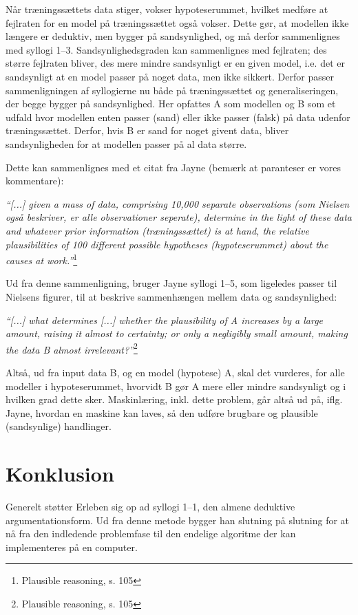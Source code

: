 \documentclass[10pt,a4paper]{article}
\newcommand{\citat}[2]{\begin{justify}\textit{``#1''}\hspace{0.1cm}\footnote{#2}\end{justify}}
\begin{document}
Når træningssættets data stiger, vokser hypoteserummet, hvilket medføre at fejlraten for en model på træningssættet også vokser. Dette gør, at modellen ikke længere er deduktiv, men bygger på sandsynlighed, og må derfor sammenlignes med syllogi 1--3. Sandsynlighedsgraden kan sammenlignes med fejlraten; des større fejlraten bliver, des mere mindre sandsynligt er en given model, i.e. det er sandsynligt at en model passer på noget data, men ikke sikkert. Derfor passer sammenligningen af syllogierne nu både på træningssættet og generaliseringen, der begge bygger på sandsynlighed. Her opfattes A som modellen og B som et udfald hvor modellen enten passer (sand) eller ikke passer (falsk) på data udenfor træningssættet. Derfor, hvis B er sand for noget givent data, bliver sandsynligheden for at modellen passer på al data større.

Dette kan sammenlignes med et citat fra Jayne (bemærk at paranteser er vores kommentare):
\citat{[...] given a mass of data, comprising 10,000 separate observations (som Nielsen også beskriver, er alle observationer seperate), determine in the light of these data and whatever prior information (træningssættet) is at hand, the relative plausibilities of 100 different possible hypotheses (hypoteserummet) about the causes at work.}{Plausible reasoning, s. 105}

Ud fra denne sammenligning, bruger Jayne syllogi 1--5, som ligeledes passer til Nielsens figurer, til at beskrive sammenhængen mellem data og sandsynlighed:

\citat{[...] what determines [...] whether the plausibility of A increases by a large amount, raising it almost to certainty; or only a negligibly small amount, making the data B almost irrelevant?}{Plausible reasoning, s. 105}

Altså, ud fra input data B, og en model (hypotese) A, skal det vurderes, for alle modeller i hypoteserummet, hvorvidt B gør A mere eller mindre sandsynligt og i hvilken grad dette sker. Maskinlæring, inkl. dette problem, går altså ud på, iflg. Jayne, hvordan en maskine kan laves, så den udføre brugbare og plausible (sandsynlige) handlinger. 



\section{Konklusion}
Generelt støtter Erleben sig op ad syllogi 1--1, den almene deduktive argumentationsform. Ud fra denne metode bygger han slutning på slutning for at nå fra den indledende problemfase til den endelige algoritme der kan implementeres på en computer.
\end{document}
